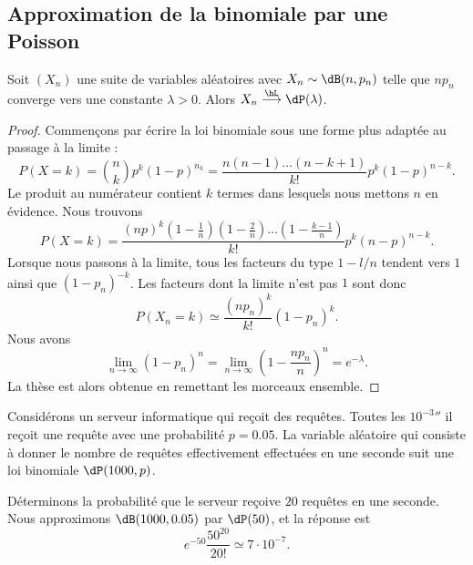\subsection{Approximation de la binomiale par une Poisson}

\begin{proposition}
	Soit \( (X_n)\) une suite de variables aléatoires avec \( X_n\sim\dB(n,p_n)\) telle que \( np_n\) converge vers une constante \( \lambda>0\). Alors \( X_n\stackrel{\hL}{\longrightarrow}\dP(\lambda)\).
\end{proposition}

\begin{proof}
	Commençons par écrire la loi binomiale sous une forme plus adaptée au passage à la limite :
	\begin{equation}
		P(X=k)={n\choose k}p^k(1-p)^{n_k}=\frac{ n(n-1)\ldots (n-k+1) }{ k! }p^k(1-p)^{n-k}.
	\end{equation}
	Le produit au numérateur contient \( k\) termes dans lesquels nous mettons \( n\) en évidence. Nous trouvons
	\begin{equation}
		P(X=k)=\frac{ (np)^k\left( 1-\frac{1}{ n } \right)\left( 1-\frac{ 2 }{ n } \right)\ldots\left( 1-\frac{ k-1 }{ n } \right) }{ k! }p^k(n-p)^{n-k}.
	\end{equation}
	Lorsque nous passons à la limite, tous les facteurs du type \( 1-l/n\) tendent vers \( 1\) ainsi que \( (1-p_n)^{-k}\). Les facteurs dont la limite n'est pas \( 1\) sont donc
	\begin{equation}
		P(X_n=k)\simeq\frac{ (np_n)^k }{ k! }(1-p_n)^k.
	\end{equation}
	Nous avons
	\begin{equation}
		\lim_{n\to \infty} (1-p_n)^n=\lim_{n\to \infty} \left( 1-\frac{ np_n }{ n } \right)^n= e^{-\lambda}.
	\end{equation}
	La thèse est alors obtenue en remettant les morceaux ensemble.
\end{proof}

\begin{example}
	Considérons un serveur informatique qui reçoit des requêtes. Toutes les \( \unit{10^{-3}}{\second}\) il reçoit une requête avec une probabilité \( p=0.05\). La variable aléatoire qui consiste à donner le nombre de requêtes effectivement effectuées en une seconde suit une loi binomiale \( \dP(1000,p)\).

	Déterminons la probabilité que le serveur reçoive \( 20\) requêtes en une seconde. Nous approximons \( \dB(1000,0.05)\) par \( \dP(50)\), et la réponse est
	\begin{equation}
		e^{-50}\frac{ 50^{20} }{ 20! }\simeq 7\cdot 10^{-7}.
	\end{equation}
\end{example}

